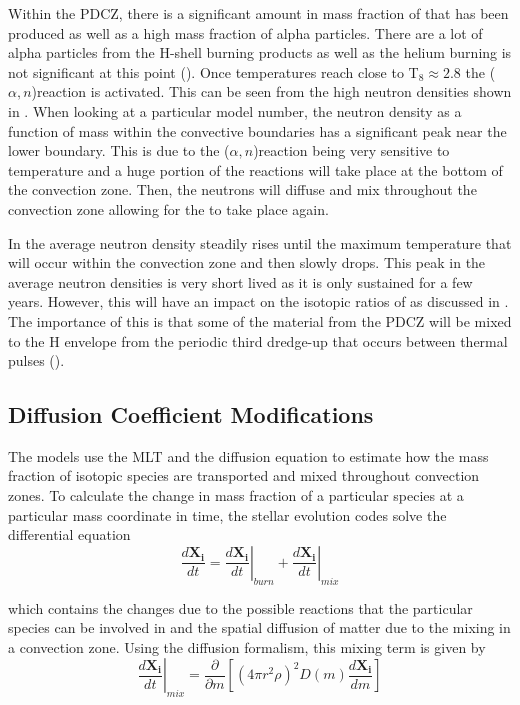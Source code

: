 \documentclass[fleqn,usenatbib]{mnras}
\begin{document}
Within the PDCZ, there is a significant amount in mass fraction of \neon[22] that has been produced as well as a high mass fraction of alpha particles. There are a lot of alpha particles from the H-shell burning products as well as the helium burning is not significant at this point (). Once temperatures reach close to T$_{8} \approx 2.8$ the \neon[22]($\alpha,n$)\magnesium[25] reaction is activated. This can be seen from the high neutron densities shown in . When looking at a particular model number, the neutron density as a function of mass within the convective boundaries has a significant peak near the lower boundary. This is due to the \neon[22]($\alpha,n$)\magnesium[25] reaction being very sensitive to temperature and a huge portion of the reactions will take place at the bottom of the convection zone. Then, the neutrons will diffuse and mix throughout the convection zone allowing for the \spr to take place again. 

In  the average neutron density steadily rises until the maximum temperature that will occur within the convection zone and then slowly drops. This peak in the average neutron densities is very short lived as it is only sustained for a few years. However, this will have an impact on the isotopic ratios of \zirconium as discussed in . The importance of this is that some of the material from the PDCZ will be mixed to the H envelope from the periodic third dredge-up that occurs between thermal pulses ().

\subsection{Diffusion Coefficient Modifications}
\label{sec:diffusion}

The \MESA models use the MLT and the diffusion equation to estimate how the mass fraction of isotopic species are transported and mixed throughout convection zones. To calculate the change in mass fraction of a particular species at a particular mass coordinate in time, the stellar evolution codes solve the differential equation 
\begin{equation}
\frac{d\mathbf{X_{i}}}{dt} = \left. \frac{d\mathbf{X_{i}}}{dt} \right \rvert_{burn} + \left. \frac{d\mathbf{X_{i}}}{dt} \right \rvert_{mix}
\end{equation}

\noindent which contains the changes due to the possible reactions that the particular species can be involved in and the spatial diffusion of matter due to the mixing in a convection zone. Using the diffusion formalism, this mixing term is given by
\begin{equation}
\left. \frac{d\mathbf{X_{i}}}{dt} \right \rvert_{mix} = \frac{\partial}{\partial m} [(4\pi r^{2} \rho)^{2} D(m) \frac{d\mathbf{X_{i}}}{dm}]
\label{eq:diffusion}
\end{equation} 
\end{document}
